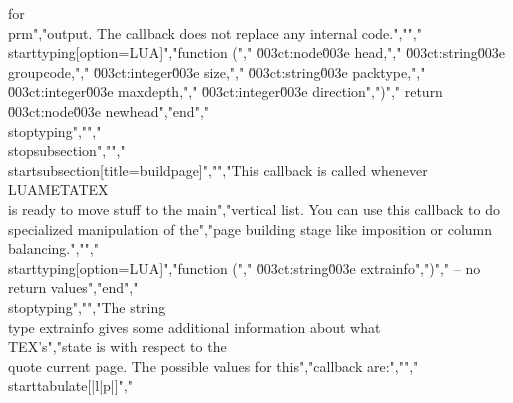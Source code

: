 for \\prm","{output}. The callback does not replace any internal code.","","\\starttyping[option=LUA]","function (","    \u003ct:node\u003e    head,","    \u003ct:string\u003e  groupcode,","    \u003ct:integer\u003e size,","    \u003ct:string\u003e  packtype,","    \u003ct:integer\u003e maxdepth,","    \u003ct:integer\u003e direction",")","    return \u003ct:node\u003e newhead","end","\\stoptyping","","\\stopsubsection","","\\startsubsection[title=buildpage]","","This callback is called whenever \\LUAMETATEX\\ is ready to move stuff to the main","vertical list. You can use this callback to do specialized manipulation of the","page building stage like imposition or column balancing.","","\\starttyping[option=LUA]","function (","    \u003ct:string\u003e extrainfo",")","    -- no return values","end","\\stoptyping","","The string \\type {extrainfo} gives some additional information about what \\TEX's","state is with respect to the \\quote {current page}. The possible values for this","callback are:","","\\starttabulate[|l|p|]","%